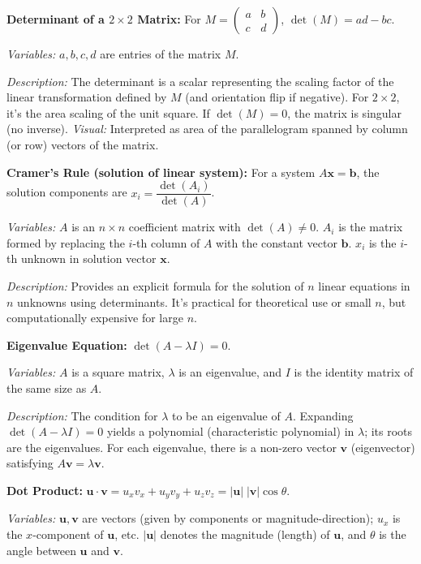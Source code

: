 \documentclass{article}
\begin{document}
\textbf{Determinant of a $2\times2$ Matrix:} For $\displaystyle M=\begin{pmatrix}a & b\\ c & d\end{pmatrix}$, $\det(M) = ad - bc$.

\textit{Variables:} $a,b,c,d$ are entries of the matrix $M$.

\textit{Description:} The determinant is a scalar representing the scaling factor of the linear transformation defined by $M$ (and orientation flip if negative). For $2\times2$, it’s the area scaling of the unit square. If $\det(M)=0$, the matrix is singular (no inverse). \textit{Visual:} Interpreted as area of the parallelogram spanned by column (or row) vectors of the matrix.

\textbf{Cramer’s Rule (solution of linear system):} For a system $A\mathbf{x}=\mathbf{b}$, the solution components are $x_i = \dfrac{\det(A_i)}{\det(A)}$.

\textit{Variables:} $A$ is an $n\times n$ coefficient matrix with $\det(A)\neq0$. $A_i$ is the matrix formed by replacing the $i$-th column of $A$ with the constant vector $\mathbf{b}$. $x_i$ is the $i$-th unknown in solution vector $\mathbf{x}$.

\textit{Description:} Provides an explicit formula for the solution of $n$ linear equations in $n$ unknowns using determinants. It’s practical for theoretical use or small $n$, but computationally expensive for large $n$.

\textbf{Eigenvalue Equation:} $\det(A - \lambda I) = 0$.

\textit{Variables:} $A$ is a square matrix, $\lambda$ is an eigenvalue, and $I$ is the identity matrix of the same size as $A$.

\textit{Description:} The condition for $\lambda$ to be an eigenvalue of $A$. Expanding $\det(A-\lambda I)=0$ yields a polynomial (characteristic polynomial) in $\lambda$; its roots are the eigenvalues. For each eigenvalue, there is a non-zero vector $\mathbf{v}$ (eigenvector) satisfying $A\mathbf{v} = \lambda \mathbf{v}$.

\textbf{Dot Product:} $\mathbf{u}\cdot \mathbf{v} = u_x v_x + u_y v_y + u_z v_z = |\mathbf{u}|\;|\mathbf{v}|\cos\theta$.

\textit{Variables:} $\mathbf{u}, \mathbf{v}$ are vectors (given by components or magnitude-direction); $u_x$ is the $x$-component of $\mathbf{u}$, etc. $|\mathbf{u}|$ denotes the magnitude (length) of $\mathbf{u}$, and $\theta$ is the angle between $\mathbf{u}$ and $\mathbf{v}$.
\end{document}
